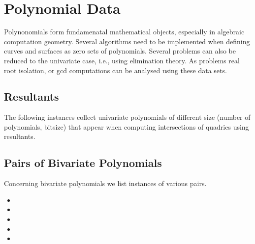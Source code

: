 \section{Polynomial Data}

Polynonomials form fundamenatal mathematical objects, especially
in algebraic computation geometry. Several algorithms need to be implemented
when defining curves and surfaces as zero sets of polynomials. Several
problems can also be reduced to the univariate case, i.e., using elimination
theory. As problems real root isolation, or gcd computations can be
analysed using these data sets.

\subsection{Resultants}

The following instances collect univariate polynomials
of different size (number of polynomials, bitsize) that appear
when computing intersections of quadrics using resultants.


\subsection{Pairs of Bivariate Polynomials}

Concerning bivariate polynomials we list instances of various pairs.
\begin{itemize}
\item {}
\item {}
\item {}
\item {}
\item {}
\end{itemize}


